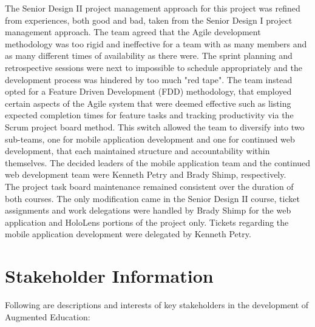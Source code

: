 The Senior Design II project management approach for this project was refined from experiences, both good and bad, taken from the Senior Design I project management approach.  The team agreed that the Agile development methodology was too rigid and ineffective for a team with as many members and as many different times of availability as there were.  The sprint planning and retrospective sessions were next to impossible to schedule appropriately and the development process was hindered by too much "red tape". The team instead opted for a Feature Driven Development (FDD) methodology, that employed certain aspects of the Agile system that were deemed effective such as listing expected completion times for feature tasks and tracking productivity via the Scrum project board method. This switch allowed the team to diversify into two sub-teams, one for mobile application development and one for continued web development, that each maintained structure and accountability within themselves.  The decided leaders of the mobile application team and the continued web development team were Kenneth Petry and Brady Shimp, respectively.\\

The project task board maintenance remained consistent over the duration of both courses. The only modification came in the Senior Design II course, ticket assignments and work delegations were handled by Brady Shimp for the web application and HoloLens portions of the project only.  Tickets regarding the mobile application development were delegated by Kenneth Petry.


\section{Stakeholder Information}



Following are descriptions and interests of key stakeholders in the development of Augmented Education:


